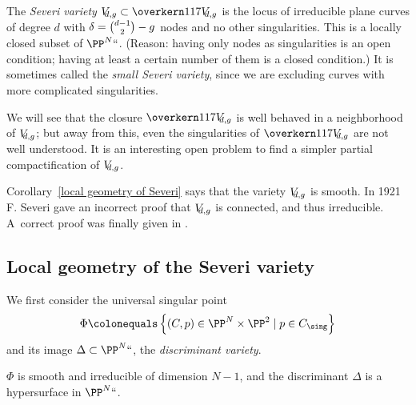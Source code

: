 \begin{definition}
The \emph{Severi variety}
%
$\Vdg \subset \Vdgbar$ is the locus of irreducible plane curves of
%
degree $d$ with $\delta = \tbinom{d-1}{2} - g$ nodes and no other
singularities. This is a locally closed subset of $\PP^N` `$.
(Reason: having only nodes as singularities is an open condition; having at least a certain number of them
is a closed condition.)
It is sometimes
%
called the \emph{small Severi variety}, since we are excluding curves with more complicated singularities.
\end{definition}

We will see that the closure $\Vdgbar$ is well behaved in a
neighborhood of $\Vdg$; but away from this, even the singularities
of $\Vdgbar$ are not well understood. It
is an interesting open
problem to find a simpler partial compactification of $ \Vdg$.

\begin{fact}\label{severi irreducible}
Corollary~\ref{local geometry of Severi} says that
the variety $\Vdg$ is smooth. In 1921 F. Severi gave an incorrect
proof
that $\Vdg$ is
connected, and thus irreducible.
%
%
A~correct proof was finally given in \cite{MR837522}.
\end{fact}


\subsection*{Local geometry of the Severi variety}

We first consider the
%
%
universal singular point
$$
\Phi \colonequals  \left\{ (C, p) \in \PP^N \times \PP^2 \mid p \in C_{\sing} \right\}
$$
and its image $\Delta\subset \PP^N` `$, the \emph{discriminant variety}.
%

\begin{proposition}
\label{local severi geometry}
 $\Phi$
is smooth and irreducible of dimension $N-1$,
and the discriminant $\Delta$ is a hypersurface in $\PP^N` `$.
\unif
\end{proposition}

